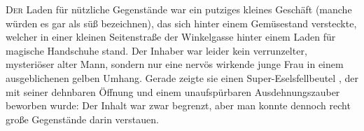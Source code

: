 \lettrine{D}{er} Laden für nützliche Gegenstände war ein putziges kleines Geschäft (manche würden es gar als süß bezeichnen), das sich hinter einem Gemüsestand versteckte, welcher in einer kleinen Seitenstraße der Winkelgasse hinter einem Laden für magische Handschuhe stand. Der Inhaber war leider kein verrunzelter, mysteriöser alter Mann, sondern nur eine nervös wirkende junge Frau in einem ausgeblichenen gelben Umhang. Gerade zeigte sie einen Super-Eselsfellbeutel , der mit seiner dehnbaren Öffnung und einem unaufspürbaren Ausdehnungszauber beworben wurde: Der Inhalt war zwar begrenzt, aber man konnte dennoch recht große Gegenstände darin verstauen.

